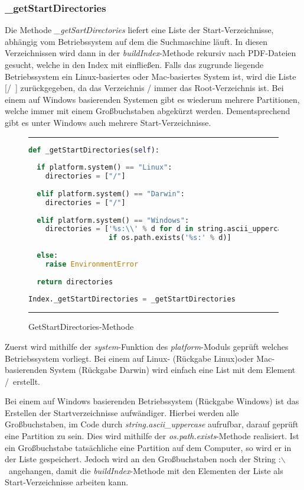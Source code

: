 \subsubsection{\_getStartDirectories}

Die Methode \textit{\_getSartDirectories} liefert eine Liste der Start-Verzeichnisse, abhängig vom Betriebssystem auf dem die Suchmaschine läuft. In diesen Verzeichnissen wird dann in der \textit{buildIndex}-Methode rekursiv nach PDF-Dateien gesucht, welche in den Index mit einfließen. Falls das zugrunde liegende Betriebssystem ein Linux-basiertes oder Mac-basiertes System ist, wird die Liste [\glqq /\grqq\ ] zurückgegeben, da das Verzeichnis / immer das Root-Verzeichnis ist. Bei einem auf Windows basierenden Systemen gibt es wiederum mehrere Partitionen, welche immer mit einem Großbuchstaben abgekürzt werden. Dementsprechend gibt es unter Windows auch mehrere Start-Verzeichnisse.

\begin{figure}
	\rule{\textwidth}{0.4pt}
	\begin{lstlisting}[language=Python]
def _getStartDirectories(self):
	
  if platform.system() == "Linux":
    directories = ["/"]
	
  elif platform.system() == "Darwin":
    directories = ["/"]
	
  elif platform.system() == "Windows":
    directories = ['%s:\\' % d for d in string.ascii_uppercase
                   if os.path.exists('%s:' % d)]
	
  else:
    raise EnvironmentError
	
  return directories
	
Index._getStartDirectories = _getStartDirectories
	\end{lstlisting}
	\rule{\textwidth}{0.4pt}
	\caption{GetStartDirectories-Methode}
	\label{fig:start}
\end{figure}

Zuerst wird mithilfe der \textit{system}-Funktion des \textit{platform}-Moduls geprüft welches Betriebssystem vorliegt. Bei einem auf Linux- (Rückgabe \glqq Linux\grqq)oder Mac-basierenden System (Rückgabe \glqq Darwin\grqq) wird einfach eine List mit dem Element \glqq /\grqq\ erstellt.

Bei einem auf Windows basierenden Betriebssystem (Rückgabe \glqq Windows\grqq) ist das Erstellen der Startverzeichnisse aufwändiger. Hierbei werden alle Großbuchstaben, im Code durch \textit{string.ascii\_uppercase} aufrufbar, darauf geprüft eine Partition zu sein. Dies wird mithilfe der \textit{os.path.exists}-Methode realisiert. Ist ein Großbuchstabe tatsächliche eine Partition auf dem Computer, so wird er in der Liste gespeichert. Jedoch wird an den Großbuchstaben noch der String \glqq :$\backslash$\grqq\ angehangen, damit die \textit{buildIndex}-Methode mit den Elementen der Liste als Start-Verzeichnisse arbeiten kann.


